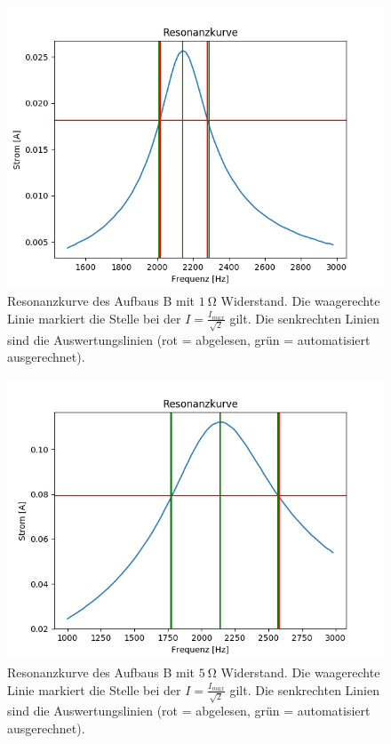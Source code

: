 \documentclass[12pt,a4paper]{article}
\begin{document}
\begin{figure}
	\centering
	\includegraphics[scale=0.8]{Bilder/Serie_Resonanzkurve_B_1.png}
	\caption{Resonanzkurve des Aufbaus B mit $\SI{1}{\ohm}$ Widerstand. Die waagerechte Linie markiert die Stelle bei der $I = \frac{I_{max}}{\sqrt{2}}$ gilt. Die senkrechten Linien sind die Auswertungslinien (rot = abgelesen, grün = automatisiert ausgerechnet).}
	\label{fig:Serie_Resonanzkurve_B_1}
\end{figure}
\begin{figure}
	\centering
	\includegraphics[scale=0.8]{Bilder/Serie_Resonanzkurve_B_5.png}
	\caption{Resonanzkurve des Aufbaus B mit $\SI{5}{\ohm}$ Widerstand. Die waagerechte Linie markiert die Stelle bei der $I = \frac{I_{max}}{\sqrt{2}}$ gilt. Die senkrechten Linien sind die Auswertungslinien (rot = abgelesen, grün = automatisiert ausgerechnet).}
	\label{fig:Serie_Resonanzkurve_B_5}
\end{figure}
\end{document}
